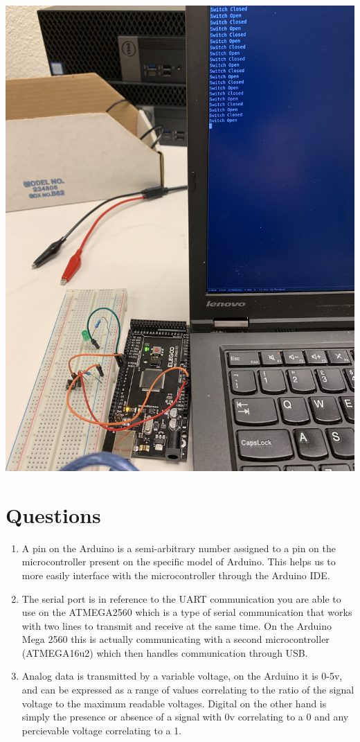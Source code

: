 \documentclass[]{article}
\begin{document}
\begin{center}
	\includegraphics[scale=.06,angle=-90]{3.jpg}
\end{center}
\pagebreak
\section{Questions}
\begin{enumerate}
	\item A pin on the Arduino is a semi-arbitrary number assigned to a pin on the microcontroller present on the specific model of Arduino.
	This helps us to more easily interface with the microcontroller through the Arduino IDE.
	\item The serial port is in reference to the UART communication you are able to use on the ATMEGA2560 which is a type of serial communication that works with two lines to transmit and receive at the same time.
	On the Arduino Mega 2560 this is actually communicating with a second microcontroller (ATMEGA16u2) which then handles communication through USB.
	\item Analog data is transmitted by a variable voltage, on the Arduino it is 0-5v, and can be expressed as a range of values correlating to the ratio of the signal voltage to the maximum readable voltages.
	Digital on the other hand is simply the presence or absence of a signal with 0v correlating to a 0 and any percievable voltage correlating to a 1.
\end{enumerate}
\end{document}

